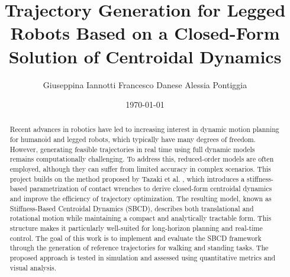 \documentclass[12pt,a4paper,oneside]{article}
\title{Trajectory Generation for Legged Robots Based on a  Closed-Form Solution of Centroidal Dynamics}	                                    %
\author{Giuseppina Iannotti Francesco Danese Alessia Pontiggia}
\date{\today}									    %
\theoremstyle{definition}
\theoremstyle{remark} %
\begin{document}

\newpage
\tableofcontents
\newpage
\begin{abstract}
\begin{sloppypar}
\noindent
Recent advances in robotics have led to increasing interest in dynamic motion planning for humanoid and legged robots, which typically have many degrees of freedom. However, generating feasible trajectories in real time using full dynamic models remains computationally challenging. To address this, reduced-order models are often employed, although they can suffer from limited accuracy in complex scenarios. This project builds on the method proposed by Tazaki et al. \cite{tazaki2024trajectory}, which introduces a stiffness-based parametrization of contact wrenches to derive closed-form centroidal dynamics and improve the efficiency of trajectory optimization. The resulting model, known as Stiffness-Based Centroidal Dynamics (SBCD), describes both translational and rotational motion while maintaining a compact and analytically tractable form. This structure makes it particularly well-suited for long-horizon planning and real-time control. The goal of this work is to implement and evaluate the SBCD framework through the generation of reference trajectories for walking and standing tasks. The proposed approach is tested in simulation and assessed using quantitative metrics and visual analysis.
\end{sloppypar}
\end{abstract}
\newpage

\clearpage

\clearpage

\clearpage

\clearpage

\clearpage

\clearpage



\end{document}

